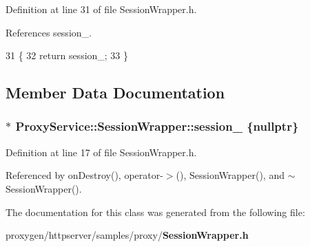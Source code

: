 Definition at line 31 of file Session\+Wrapper.\+h.



References session\+\_\+.


\begin{DoxyCode}
31                                                   \{
32     \textcolor{keywordflow}{return} session_;
33   \}
\end{DoxyCode}


\subsection{Member Data Documentation}
\subsubsection[{session\+\_\+}]{$\ast$ Proxy\+Service\+::\+Session\+Wrapper\+::session\+\_\+ \{{\bf nullptr}\}\hspace{0.3cm}{\ttfamily [private]}}\label{classProxyService_1_1SessionWrapper_ae33648bef3b893c760ff3b97be233847}


Definition at line 17 of file Session\+Wrapper.\+h.



Referenced by on\+Destroy(), operator-\/$>$(), Session\+Wrapper(), and $\sim$\+Session\+Wrapper().



The documentation for this class was generated from the following file\+:\begin{DoxyCompactItemize}
\item 
proxygen/httpserver/samples/proxy/{\bf Session\+Wrapper.\+h}\end{DoxyCompactItemize}
